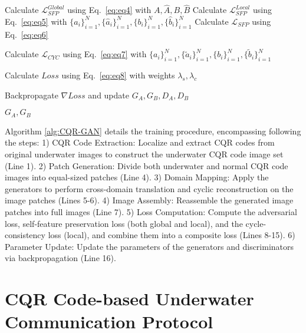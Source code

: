 \documentclass[preprint,12pt]{elsarticle}
\begin{document}
\begin{algorithm}[H]
\begin{algorithmic}[1]
  \State Calculate $\mathcal{L}_{SFP}^{Global}$ using Eq.~\ref{eq:eq4} with $A, \hat A, B, \hat B$   %
  \State Calculate $\mathcal{L}_{SFP}^{Local}$ using Eq.~\ref{eq:eq5} with $\{a_i\}_{i=1}^N, \{\hat a_i\}_{i=1}^N, \{b_i\}_{i=1}^N, \{\hat b_i\}_{i=1}^N$   %
 \State  Calculate $\mathcal{L}_{SFP}$ using Eq.~\ref{eq:eq6}  %


  \State Calculate $\mathcal{L}_{CYC}$ using Eq.~\ref{eq:eq7} with $\{a_i\}_{i=1}^N, \{\tilde a_i\}_{i=1}^N, \{b_i\}_{i=1}^N, \{\tilde b_i\}_{i=1}^N$   %

  \State Calculate $Loss$ using Eq.~\ref{eq:eq8} with weights $\lambda_s, \lambda_c$ 

  \State Backpropagate $\nabla Loss$ and update $G_A, G_B, D_A, D_B$  

\EndFor
\EndFor
\State \Return $G_A, G_B$
\end{algorithmic}
\end{algorithm}

Algorithm \ref{alg:CQR-GAN} details the training procedure, encompassing following the steps: 
1) CQR Code Extraction: Localize and extract CQR codes from original underwater images to construct the underwater CQR code image set (Line 1). 
2) Patch Generation: Divide both underwater and normal CQR code images into equal-sized patches (Line 4). 
3) Domain Mapping: Apply the generators to perform cross-domain translation and cyclic reconstruction on the image patches (Lines 5-6). 
4) Image Assembly: Reassemble the generated image patches into full images (Line 7). 
5) Loss Computation: Compute the adversarial loss, self-feature preservation loss (both global and local), and the cycle-consistency loss (local), and combine them into a composite loss (Lines 8-15). 
6) Parameter Update: Update the parameters of the generators and discriminators via backpropagation (Line 16).

\section{CQR Code-based Underwater Communication Protocol}
\end{document}
